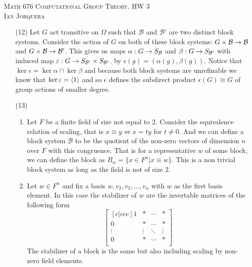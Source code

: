 \documentclass[12pt]{amsart}
\begin{document}
\begin{center}
   \textsc{Math 676 Computational Group Theory. HW 3\\ Ian Jorquera}
\end{center}
\vspace{1em}

\begin{itemize}
   \item[(12)] Let $G$ act transitive on $\Omega$ such that $\mathcal B$ 
   and $\mathcal B'$ are two distinct block systems. Consider the action of 
   $G$ on both of these block systems: $G\times \mathcal B\rightarrow \mathcal B$ and
   $G\times \mathcal B\rightarrow \mathcal B'$. This gives us maps $\alpha:G\rightarrow S_{\mathcal B}$ 
   and $\beta:G\rightarrow S_{\mathcal B'}$ with induced map $\varepsilon:G\rightarrow S_{\mathcal B'}\times S_{\mathcal B'}$.
   by $\epsilon(g)=(\alpha(g),\beta(g))$. Notice that $\ker\epsilon=\ker\alpha\cap\ker\beta$ 
   and because both block systems are unrefinable we know that $\ker\varepsilon=\left\langle 1 \right\rangle$ and
   so $\epsilon$ defines the subdirect product $\epsilon(G)\cong G$ of group actions of smaller degree.


   \item[(13)] 
   \begin{enumerate}[label= (\alph*)]
      \item Let $F$ be a finite field of size not equal to $2$.
      Consider the equivalence relation of scaling, that is 
      $x\equiv y \Leftrightarrow x=ty$ for $t\neq 0$. And we can define a 
      block system $\mathcal B$ to be the quotient of the non-zero vectors of 
      dimension $n$ over $F$ with this congruence. That is for a representative $w$ of some block, we
      can define the block as $B_w=\{x\in F^n | x\equiv w\}$. This is a non trivial
      block system as long as the field is not of size $2$.
      
      \item Let $w\in F^n$ and fix a basis $w,v_2,v_3,\dots,v_n$ with $w$ as the 
      first basis element. In this case the stabilizer of $w$ are the invertable matrices 
      of the following form
      \[\begin{bmatrix}[c|ccc]
         1&*&\cdots&*\\
         0&*&\cdots&*\\
         \vdots&\vdots&\ddots&\vdots\\
         0&*&\cdots&*\\
         \end{bmatrix}\]
         The stabilizer of a block is the same but also including scaling by non-zero field elements.


\end{enumerate}
\end{itemize}
\end{document}
